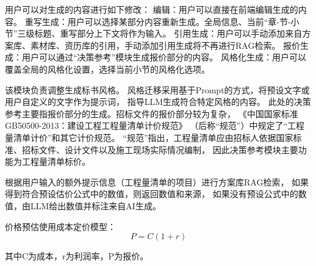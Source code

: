 \documentclass{xmu}
\begin{document}
用户可以对生成的内容进行如下修改：
编辑：用户可以直接在前端编辑生成的内容。
重写生成：用户可以选择某部分内容重新生成。全局信息、当前“章-节-小节”三级标题、重写部分上下文将作为输入。
引用生成：用户可以手动添加来自方案库、素材库、资历库的引用，手动添加引用生成将不再进行RAG检索。
报价生成：用户可以通过“决策参考”模块生成报价部分的内容。
风格化生成：用户可以覆盖全局的风格化设置，选择当前小节的风格化选项。

该模块负责调整生成标书风格。
风格迁移采用基于Prompt的方式，将预设文字或用户自定义的文字作为提示词，
指导LLM生成符合特定风格的内容。
此处的决策参考主要指报价部分的生成。招标文件的报价部分较为复杂，
《中国国家标准GB50500-2013：建设工程工程量清单计价规范》
（后称“规范”）中规定了“工程量清单计价”和其它计价规范。
“规范”指出，工程量清单应由招标人依据国家标准、招标文件、设计文件以及施工现场实际情况编制，
因此决策参考模块主要功能为工程量清单标价。

根据用户输入的额外提示信息（工程量清单的项目）进行方案库RAG检索，
如果得到符合预设估价公式中的数值，则返回数值和来源，
如果没有预设公式中的数值，由LLM给出数值并标注来自AI生成。

价格预估使用成本定价模型：
\begin{equation}
    P = C (1+r)
\end{equation}

其中C为成本，r为利润率，P为报价。
\end{document}
